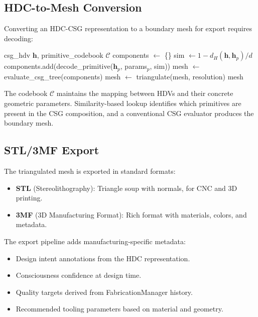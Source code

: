 \documentclass[11pt,a4paper]{article}
\begin{document}
\subsection{HDC-to-Mesh Conversion}
\label{sec:hdctomesh}

Converting an HDC-CSG representation to a boundary mesh for export requires decoding:

\begin{algorithm}[h]
\caption{HDC-to-Mesh Conversion}
\label{alg:hdctomesh}
\begin{algorithmic}[1]
\REQUIRE csg\_hdv $\mathbf{h}$, primitive\_codebook $\mathcal{C}$
\STATE components $\leftarrow$ \{\}
    \STATE sim $\leftarrow 1 - d_H(\mathbf{h}, \mathbf{h}_p) / d$
        \STATE components.add(decode\_primitive($\mathbf{h}_p$, params$_p$, sim))
    \ENDIF
\ENDFOR
\STATE mesh $\leftarrow$ evaluate\_csg\_tree(components)
\STATE mesh $\leftarrow$ triangulate(mesh, resolution)
\RETURN mesh
\end{algorithmic}
\end{algorithm}

The codebook $\mathcal{C}$ maintains the mapping between HDVs and their concrete geometric parameters. Similarity-based lookup identifies which primitives are present in the CSG composition, and a conventional CSG evaluator produces the boundary mesh.

\subsection{STL/3MF Export}

The triangulated mesh is exported in standard formats:

\begin{itemize}[nosep]
    \item \textbf{STL} (Stereolithography): Triangle soup with normals, for CNC and 3D printing.
    \item \textbf{3MF} (3D Manufacturing Format): Rich format with materials, colors, and metadata.
\end{itemize}

The export pipeline adds manufacturing-specific metadata:
\begin{itemize}[nosep]
    \item Design intent annotations from the HDC representation.
    \item Consciousness confidence at design time.
    \item Quality targets derived from FabricationManager history.
    \item Recommended tooling parameters based on material and geometry.
\end{itemize}
\end{document}

